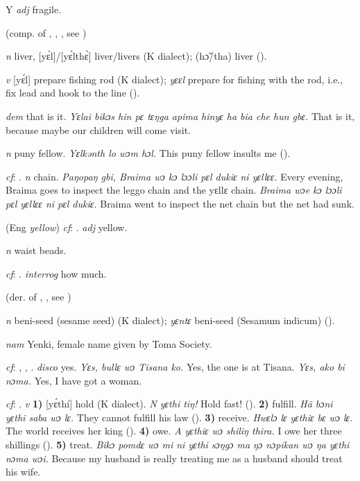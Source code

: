 \begin{letter}{Y}
 \textit{adj} fragile.

 (comp. of , , , see ) 

 \textit{n} liver, [yɛ́l]/[yɛ́lthɛ̀] liver/livers (K dialect); (hɔ̃/tha) liver (\citealt{Pichl1967}).

 \textit{v} [yɛ́l] prepare fishing rod (K dialect); \textit{yɛɛl} prepare for fishing with the rod, i.e., fix lead and hook to the line (\citealt{Pichl1967}).

 \textit{dem} that is it. \textit{Yɛlai bikɔs hin pɛ tɛŋga apima hinyɛ ha bia che hun gbɛ.} That is it, because maybe our children will come visit.

 \textit{n} puny fellow. \textit{Yɛlkənth lo wɔm hɔl.} This puny fellow insults me (\citealt{Pichl1967}).

 \textit{cf}: . \textit{n} chain. \textit{Paŋopaŋ gbi, Braima wɔ kɔ lɔɔli pɛl dukiɛ ni yɛllɛɛ.} Every evening, Braima goes to inspect the leggo chain and the yɛllɛ chain. \textit{Braima wɔe kɔ lɔɔli pɛl yɛllɛɛ ni pɛl dukiɛ.} Braima went to inspect the net chain but the net had sunk.

 (Eng \textit{yellow}) \textit{cf}: . \textit{adj} yellow.

 \textit{n} waist beads.

 \textit{cf}: . \textit{interrog} how much.

 (der. of , , see ) 

 \textit{n} beni-seed (sesame seed) (K dialect); \textit{yɛntɛ} beni-seed (Sesamum indicum) (\citealt{Pichl1967}).

 \textit{nam} Yenki, female name given by Toma Society. 

 \textit{cf}: , , . \textit{disco} yes. \textit{Yɛs, bullɛ wɔ Tisana ko.} Yes, the one is at Tisana. \textit{Yɛs, ako bi nɔma.} Yes, I have got a woman.

 \textit{cf}: . \textit{v} \textbf{1)} [yɛ́thí] hold (K dialect). \textit{N yɛthi tiŋ!} Hold fast! (\citealt{Pichl1967}). \textbf{2)} fulfill. \textit{Hã bɔni yɛthi saba wɔ lɛ.} They cannot fulfill his law (\citealt{Pichl1967}). \textbf{3)} receive. \textit{Hwɛlɔ lɛ yɛthiɛ bɛ wɔ lɛ.} The world receives her king (\citealt{Pichl1967}). \textbf{4)} owe. \textit{A yɛthiɛ wɔ shiliŋ thira.} I owe her three shillings (\citealt{Pichl1967}). \textbf{5)} treat. \textit{Bikɔ pomdɛ wɔ mi ni yɛthi sɔŋgɔ ma ŋɔ nɔpikan wɔ ŋa yɛthi nɔma wɔi.} Because my husband is really treating me as a husband should treat his wife.


\end{letter}
